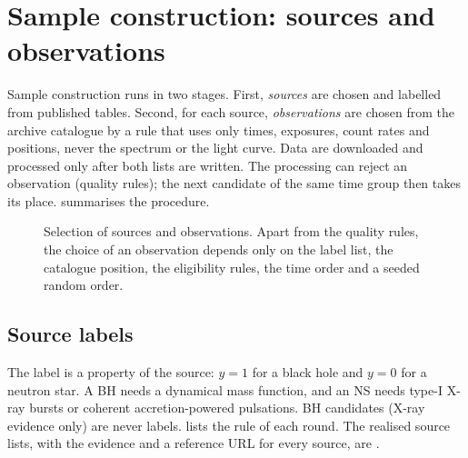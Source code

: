 \section{Sample construction: sources and observations}\label{sec:samples}

Sample construction runs in two stages. First, \emph{sources} are chosen and labelled from published tables. Second, for each
source, \emph{observations} are chosen from the archive catalogue by a rule that uses only times, exposures, count rates and
positions, never the spectrum or the light curve. Data are downloaded and processed only after both lists are written. The
processing can reject an observation (quality rules); the next candidate of the same time group then takes its place.
 summarises the procedure.

\begin{figure}[htbp]
\centering

\caption{Selection of sources and observations. Apart from the quality rules, the choice of an observation depends only on
the label list, the catalogue position, the eligibility rules, the time order and a seeded random order.}\label{fig:selectflow}
\end{figure}

\subsection{Source labels}\label{sec:labels}
The label is a property of the source: $y=1$ for a black hole and $y=0$ for a neutron star. A BH needs a dynamical mass
function, and an NS needs type-I X-ray bursts or coherent accretion-powered pulsations. BH candidates (X-ray evidence only)
are never labels.  lists the rule of each round. The realised source lists, with the evidence and a
reference URL for every source, are .

